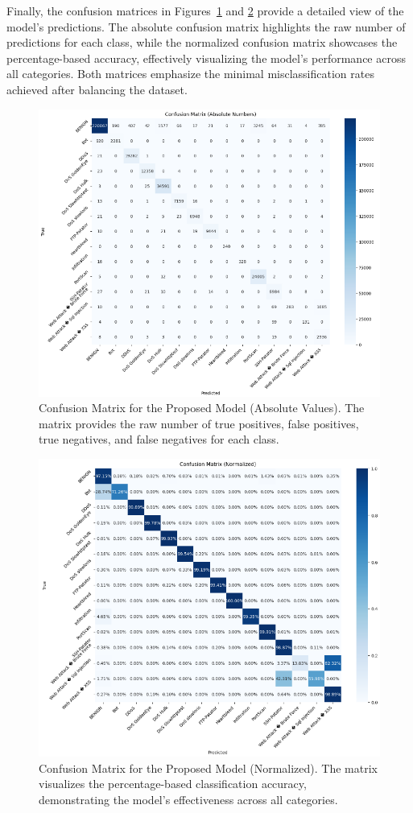 \documentclass[conference]{IEEEtran}
\begin{document}
Finally, the confusion matrices in Figures~\ref{fig:confusion_matrix_absolute} and \ref{fig:confusion_matrix_normalized} provide a detailed view of the model's predictions. The absolute confusion matrix highlights the raw number of predictions for each class, while the normalized confusion matrix showcases the percentage-based accuracy, effectively visualizing the model's performance across all categories. Both matrices emphasize the minimal misclassification rates achieved after balancing the dataset.

\begin{figure}[ht]
    \centering
    \includegraphics[width=0.8\linewidth]{4.1.png}
    \caption{Confusion Matrix for the Proposed Model (Absolute Values). The matrix provides the raw number of true positives, false positives, true negatives, and false negatives for each class.}
    \label{fig:confusion_matrix_absolute}
\end{figure}

\begin{figure}[!ht]
    \centering
    \includegraphics[width=0.8\linewidth]{4.2.png}
    \caption{Confusion Matrix for the Proposed Model (Normalized). The matrix visualizes the percentage-based classification accuracy, demonstrating the model's effectiveness across all categories.}
    \label{fig:confusion_matrix_normalized}
\end{figure}
\end{document}
